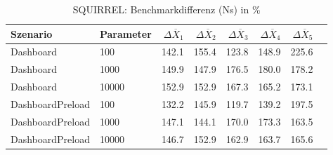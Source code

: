 
\begin{table}[ht]
\setlength{\extrarowheight}{-1pt}
\centering
\caption{SQUIRREL: Benchmarkdifferenz (Ns) in \%}
\begin{tabular}{llrrrrrr}
\toprule
Szenario & Parameter & ${\Delta \overline{X}_1}$ & ${\Delta \overline{X}_2}$ & ${\Delta \overline{X}_3}$ & ${\Delta \overline{X}_4}$ & ${\Delta \overline{X}_5}$ \\
\midrule
	Dashboard & 100 & \cellcolor{red!27}  142.1 & \cellcolor{red!30}  155.4 & \cellcolor{red!20}  123.8 & \cellcolor{red!30}  148.9 & \cellcolor{red!30}  225.6 \\
	Dashboard & 1000 & \cellcolor{red!30}  149.9 & \cellcolor{red!29}  147.9 & \cellcolor{red!30}  176.5 & \cellcolor{red!30}  180.0 & \cellcolor{red!30}  178.2 \\
	Dashboard & 10000 & \cellcolor{red!30}  152.9 & \cellcolor{red!30}  152.9 & \cellcolor{red!30}  167.3 & \cellcolor{red!30}  165.2 & \cellcolor{red!30}  173.1 \\
	DashboardPreload & 100 & \cellcolor{red!23}  132.2 & \cellcolor{red!28}  145.9 & \cellcolor{red!18}  119.7 & \cellcolor{red!26}  139.2 & \cellcolor{red!30}  197.5 \\
	DashboardPreload & 1000 & \cellcolor{red!29}  147.1 & \cellcolor{red!28}  144.1 & \cellcolor{red!30}  170.0 & \cellcolor{red!30}  173.3 & \cellcolor{red!30}  163.5 \\
	DashboardPreload & 10000 & \cellcolor{red!29}  146.7 & \cellcolor{red!30}  152.9 & \cellcolor{red!30}  162.9 & \cellcolor{red!30}  163.7 & \cellcolor{red!30}  165.6 \\
\bottomrule
\end{tabular}
\label{tab:benchmarkdifferenz_squirrel_ns}
\end{table}
	